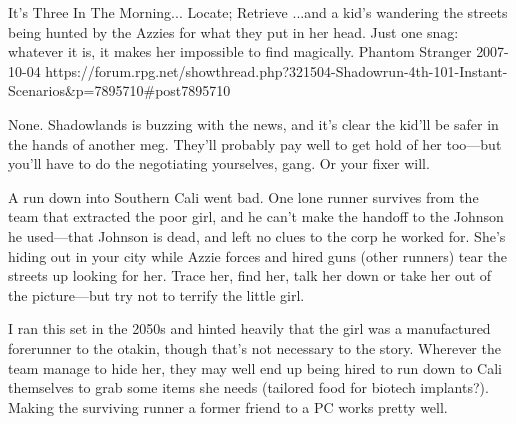 \begin{scenario}{It's Three In The Morning...}
	{Locate; Retrieve}
	{...and a kid's wandering the streets being hunted by the Azzies for what they put in her head. Just one snag: whatever it is, it makes her impossible to find magically.}
	{Phantom Stranger}
	{2007-10-04}
	{https://forum.rpg.net/showthread.php?321504-Shadowrun-4th-101-Instant-Scenarios\&p=7895710\#post7895710}

  None. Shadowlands is buzzing with the news, and it's clear the kid'll be safer in the hands of another meg. They'll probably pay well to get hold of her too---but you'll have to do the negotiating yourselves, gang. Or your fixer will.

\synopsis A run down into Southern Cali went bad. One lone runner survives from the team that extracted the poor girl, and he can't make the handoff to the Johnson he used---that Johnson is dead, and left no clues to the corp he worked for. She's hiding out in your city while Azzie forces and hired guns (other runners) tear the streets up looking for her. Trace her, find her, talk her down or take her out of the picture---but try not to terrify the little girl.

\notes 
I ran this set in the 2050s and hinted heavily that the girl was a manufactured forerunner to the otakin, though that's not necessary to the story. Wherever the team manage to hide her, they may well end up being hired to run down to Cali themselves to grab some items she needs (tailored food for biotech implants?). Making the surviving runner a former friend to a PC works pretty well.

\end{scenario}
